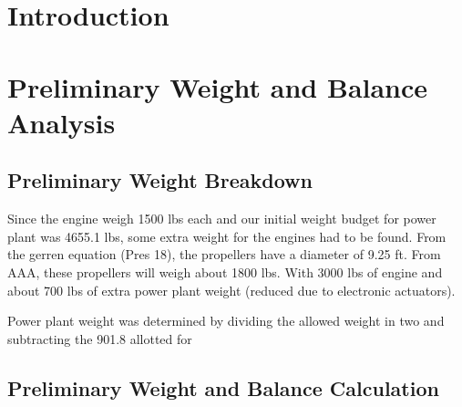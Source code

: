 \documentclass[conf]{new-aiaa}
\begin{document}
\section{Introduction}

\section{Preliminary Weight and Balance Analysis}
\subsection{Preliminary Weight Breakdown}
Since the engine weigh 1500 lbs each and our initial weight budget for power plant was 4655.1 lbs, some extra weight for the engines had to be found.
From the gerren equation (Pres 18), the propellers have a diameter of 9.25 ft. From AAA, these propellers will weigh about 1800 lbs. With 3000 lbs of engine and about 700 lbs of extra power plant weight (reduced due to electronic actuators).

Power plant weight was determined by dividing the allowed weight in two and subtracting the 901.8 allotted for 


\subsection{Preliminary Weight and Balance Calculation}
\end{document}
